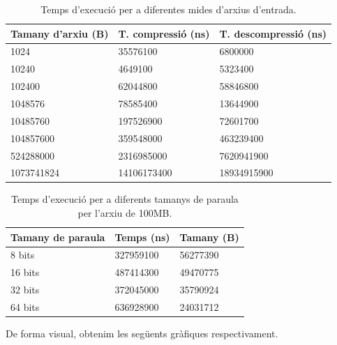 \documentclass{ieeetj}
\begin{document}
\begin{table}[H]
    \centering
    \begin{tabular}{|l|l|l|}
        \hline
        \textbf {Tamany d'arxiu (B)} & \textbf{T. compressió (ns)} & \textbf{T. descompressió (ns)} \\
        \hline
        1024       &	35576100 & 6800000\\
        10240      &	4649100 &   5323400\\
        102400     &	62044800 & 58846800\\
        1048576    &	78585400 & 13644900\\
        10485760   &	197526900 & 72601700\\
        104857600  &	359548000 & 463239400\\
        524288000  &	2316985000 &  7620941900\\
        1073741824 &	14106173400 &  18934915900\\
        \hline
    \end{tabular}
    \caption{Temps d'execució per a diferentes mides d'arxius d'entrada.}
\end{table}

\begin{table}[H]
    \centering
    \begin{tabular}{|l|l|l|}
        \hline
        \textbf {Tamany de paraula} & \textbf{Temps (ns)} & \textbf{Tamany (B)} \\
        \hline
        8 bits       &	327959100 & 56277390 \\
        16 bits     &	487414300 &   49470775\\
        32 bits     &	372045000 & 35790924\\
        64 bits    &	636928900 & 24031712\\

        \hline
    \end{tabular}
    \caption{Temps d'execució per a diferents tamanys de paraula per l'arxiu de 100MB.}
\end{table}

De forma visual, obtenim les següents gràfiques respectivament.
\end{document}
